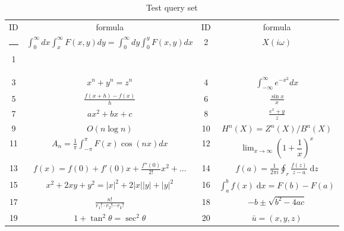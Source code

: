 \documentclass{acm_proc_article-sp}
\makeatletter
\newcommand{\thickhline}{%
    \noalign {\ifnum 0=`}\fi \hrule height 1pt
    \futurelet \reserved@a \@xhline
}
\makeatother
\begin{document}
\begin{table*}
\begin{center}
\renewcommand{\arraystretch}{1.5}
\begin{tabular}{|c|c||c|c|}\hline
ID & formula & ID & formula \\ \thickhline
1 & 
$\int_0^\infty dx \int_{x}^\infty F(x,y)dy  =\int_0^\infty dy \int_{0}^y F(x,y)dx$ &
2 & 
$X(i\omega)$ \\\hline

3 & 
$x^n + y^n=z^n$ &
4 & 
$\int^{\infty}_{-\infty} e^{-x^2} dx$ \\\hline

5 & 
$\frac{f(x+h)-f(x)}{h}$ &
6 & 
$\frac {\sin x} x$ \\\hline

7 & 
$ax^2 + bx +c$ &
8 & 
$\frac {e^x + y}{z}$ \\\hline

9 & 
$O(n \log n)$ &
10 & 
$H^n(X) = Z^n (X) / B^n(X)$ \\\hline

11 & 
$A_n = \frac 1 \pi \int_{-\pi}^\pi F(x) \cos(nx) dx$ &
12 & 
$\lim_{x \to \infty} (1 + \dfrac 1x)^x$ \\\hline

13 & 
$f(x) = f(0) + f'(0)x + \frac{f''(0)}{2!} x^2 + \ldots$ &
14 & 
$f(a) = \frac 1 {2 \pi i} \oint_r \frac{f(z)}{z-a} \;\mathrm{d}z$ \\\hline

15 & 
$x^2 + 2xy + y^2 = |x|^2 + 2|x||y| + |y| ^2$ &
16 & 
$\int_a^b f(x) \;\mathrm{d}x = F(b) - F(a)$ \\\hline

17 & 
$\frac {n!}{r_1! \cdot r_2! \cdots r_k!}$ &
18 & 
$-b \pm \sqrt{b^2 - 4ac}$ \\\hline

19 & 
$1+\tan^2 \theta = \sec^2 \theta$ &
20 & 
$\bar{u} = (x,y,z)$ \\\hline

\end{tabular}
\renewcommand{\arraystretch}{1}
\end{center}
\caption{Test query set}\label{TestQ}
\end{table*}
\end{document}
